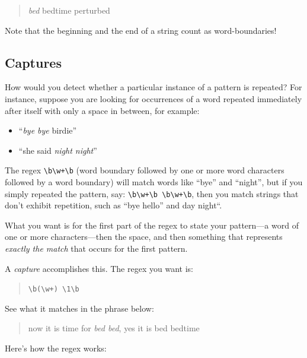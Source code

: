 \documentclass[]{book}
\providecommand{\tightlist}{%
  \setlength{\itemsep}{0pt}\setlength{\parskip}{0pt}}
\theoremstyle{definition}
\theoremstyle{definition}
\theoremstyle{definition}
\theoremstyle{remark}
\begin{document}
{\begin{quote}
\emph{bed} bedtime perturbed
\end{quote}

Note that the beginning and the end of a string count as
word-boundaries!

\subsection{Captures}\label{regex-captures}

 How would you detect whether a particular instance of a
pattern is repeated? For instance, suppose you are looking for
occurrences of a word repeated immediately after itself with only a
space in between, for example:

\begin{itemize}
\tightlist
\item
  ``\emph{bye bye} birdie''
\item
  ``she said \emph{night night}''
\end{itemize}

The regex \texttt{\textbackslash{}b\textbackslash{}w+\textbackslash{}b}
(word boundary followed by one or more word characters followed by a
word boundary) will match words like ``bye'' and ``night'', but if you
simply repeated the pattern, say:
\texttt{\textbackslash{}b\textbackslash{}w+\textbackslash{}b\ \textbackslash{}b\textbackslash{}w+\textbackslash{}b},
then you match strings that don't exhibit repetition, such as ``bye
hello'' and day night``.

What you want is for the first part of the regex to state your
pattern---a word of one or more characters---then the space, and then
something that represents \emph{exactly the match} that occurs for the
first pattern.

A \emph{capture} accomplishes this. The regex you want is:

\begin{quote}
\texttt{\textbackslash{}b(\textbackslash{}w+)\ \textbackslash{}1\textbackslash{}b}
\end{quote}

See what it matches in the phrase below:

\begin{quote}
now it is time for \emph{bed bed}, yes it is bed bedtime
\end{quote}

Here's how the regex works:

}
\end{document}
